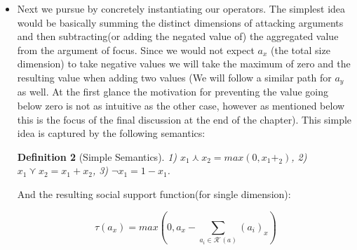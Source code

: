 \documentclass{article}
\newtheorem{definition}{Definition}
\newcommand{\args}{\mathcal{A}} %
\newcommand{\att}{\mathcal{R}}  %
\newcommand{\attackers}[1]{\att^\text{-}\left(#1\right)}
\newcommand{\SAFand}{\curlywedge}     %
\DeclareMathOperator*{\SAFOr}{\bigcurlyvee} %
\begin{document}
{\begin{itemize}
\begin{definition}[Social support]
\label{def:ss}
  Social support of an argument  $a \in \args$ is loosely $\tau(a) \triangleq \tau([a_{x}, a_{y}]) \triangleq [(\tau(a_{x})), (\tau(a_{y}))]$ where $\tau(a_{x})$ (respectively $\tau(a_{y})$):
  $$\displaystyle \tau(a_x) = a_{x} \SAFand \lnot \SAFOr_{a_i \in \attackers{a}} (a_{i})_{x}$$
\end{definition}

Please note that unlike the model function of the original work, the above function is NOT a recursive one. Thus it's neither a fixed-point calculation, nor the computation has to follow a specific order with respect to the arguments.  

\item Next we pursue by concretely instantiating our operators. The simplest idea would be basically summing the distinct dimensions of attacking arguments and then subtracting(or adding the negated value of) the aggregated value from the argument of focus.  Since we would not expect $a_{x}$ (the total size dimension) to take negative values we will take the maximum of zero and the resulting value when adding two values (We will follow a similar path for $a_{y}$ as well. At the first glance the motivation for preventing the value going below zero is not as intuitive as the other case, however as mentioned below this is the focus of the final discussion at the end of the chapter). This simple idea is captured by the following semantics:

\begin{definition} [Simple Semantics]
 1) $x_{1}\curlywedge
x_{2}=max(0, x_{1} +_{2})$, 2) $x_{1}\curlyvee x_{2}=x_{1}+x_{2}$, 3) $\lnot x_{1}=1-x_{1}$.
\end{definition}

And the resulting social support function(for single dimension):

$$\displaystyle \tau(a_x) =   max (0, a_{x} - \sum_{a_i \in \attackers{a}}^{} (a_{i})_{x}   ) $$%



\end{itemize}}
\end{document}
